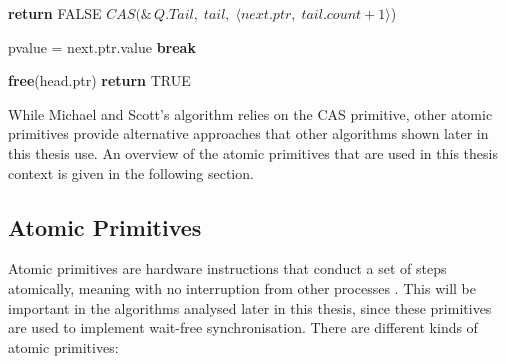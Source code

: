 \begin{algorithm}[!ht]
\begin{algorithmic}[1]
                        \State \textbf{return} FALSE
                    \Else
                        \State 
                        $CAS(\&\,Q.Tail,\; tail,\; \langle next.ptr,\; tail.count+1\rangle$)
                    \EndIf
    
                \Else
                    \State *pvalue = next.ptr.value
                        \State \textbf{break}
                    \EndIf
                \EndIf
            \EndIf
        \EndLoop
    
        \State \textbf{free}(head.ptr)
        \State \textbf{return} TRUE
    
    \EndFunction
    
    \end{algorithmic}
    \cite{MichaelScottQueue}
\end{algorithm} 

While Michael and Scott's algorithm relies on the \ac{CAS} primitive, other atomic primitives provide alternative approaches that other algorithms shown later in this thesis use. An overview of the atomic primitives that are used in this thesis context is given in the following section.

\subsection{Atomic Primitives}\label{subsec:atomic-primitives}
Atomic primitives are hardware instructions that conduct a set of steps atomically, meaning with no interruption from other processes \cite{Atomics}. This will be important in the algorithms analysed later in this thesis, since these primitives are used to implement wait-free synchronisation. There are different kinds of atomic primitives: 

